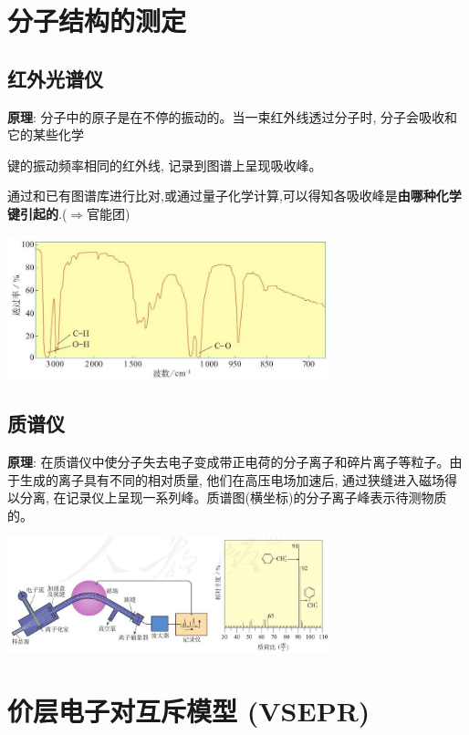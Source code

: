 \documentclass[10pt,cn]{elegantbook}
\begin{document}
\section{分子结构的测定}

\subsection{ 红外光谱仪}

\textbf{原理}: 分子中的原子是在不停的振动的。当一束红外线透过分子时, 分子会吸收和它的某些化学

键的振动频率相同的红外线, 记录到图谱上呈现吸收峰。

通过和已有图谱库进行比对,或通过量子化学计算,可以得知各吸收峰是\textbf{由哪种化学键引起的}.($\Rightarrow$官能团)

\begin{center}
	\includegraphics[max width=0.7\textwidth]{image/c75-1.jpg}
\end{center}

\subsection{质谱仪}

\textbf{原理}: 在质谱仪中使分子失去电子变成带正电荷的分子离子和碎片离子等粒子。由于生成的离子具有不同的相对质量, 他们在高压电场加速后, 通过狭缝进入磁场得以分离, 在记录仪上呈现一系列峰。质谱图\textbf{}(横坐标)的分子离子峰表示待测物质的\textbf{}。

\begin{center}
	\includegraphics[max width=0.7\textwidth]{image/c75-2.jpg}
\end{center}

\section{价层电子对互斥模型 (VSEPR)}
\end{document}
